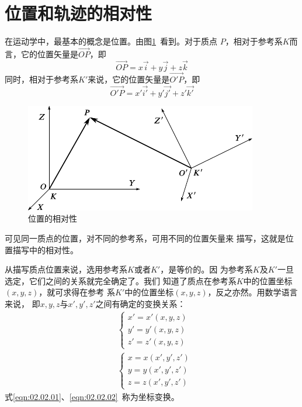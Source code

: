 \section{位置和轨迹的相对性}\label{sec:02.02}

在运动学中，最基本的概念是位置。由图\ref{fig:02.01}~看到。对于质点
$P$，相对于参考系$K$而言，它的位置矢量是$\vec{OP}$，即
\begin{equation*}
  \vec{OP}=x\vec{i}+y\vec{j}+z\vec{k}
\end{equation*}
同时，相对于参考系$K'$来说，它的位置矢量是$\vec{O'P}$，即
\begin{equation*}
  \vec{O'P}=x'\vec{i'}+y'\vec{j'}+z'\vec{k'}
\end{equation*}
\begin{figure}[h]
    \vspace{-1em}
  \centering
  \includegraphics{figure/fig02.01}
  \caption{位置的相对性}
  \label{fig:02.01}
\end{figure}

\clearpage
可见同一质点的位置，对不同的参考系，可用不同的位置矢量来
描写，这就是位置描写中的相对性。

从描写质点位置来说，选用参考系$ K $或者$ K' $，是等价的。因
为参考系$K$及$K'$一旦选定，它们之间的关系就完全确定了。我们
知道了质点在参考系$K$中的位置坐标$\left(x,y,z\right)$，就可求得在参考
系$K'$中的位置坐标$\left(x,y,z\right)$，反之亦然。用数学语言来说，
即$x,y,z$与$x',y',z'$之间有确定的变换关系：
\begin{align}
  \label{eqn:02.02.01}
   & \left\{\begin{array}{l}
              x'=x'\left(x, y, z\right) \\
              y'=y'\left(x, y, z\right) \\
              z'=z'\left(x, y, z\right)
            \end{array}\right.  \\
  \label{eqn:02.02.02}
   & \left\{\begin{array}{l}
              x=x\left(x', y', z'\right) \\
              y=y\left(x', y', z'\right) \\
              z=z\left(x', y', z'\right)
            \end{array}\right.
\end{align}
式\eqref{eqn:02.02.01}、\eqref{eqn:02.02.02}~称为坐标变换。

